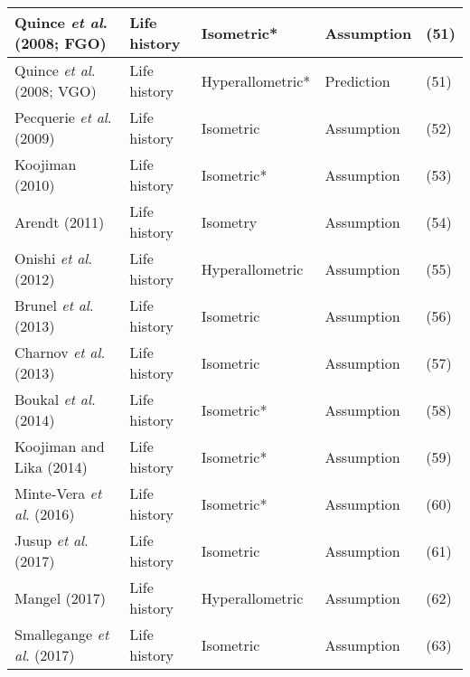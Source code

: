 \documentclass[a4paper]{article} %
\begin{document}
\begin{table}[]
\begin{tabular}{|l|l|l|l|l|}
        Quince \textit{et al}. (2008; FGO)      & Life history        & Isometric*       & Assumption                        & (51)          \\ \hline
        Quince \textit{et al}. (2008; VGO)      & Life history        & Hyperallometric* & Prediction                        & (51)          \\ \hline
        Pecquerie \textit{et al}. (2009)        & Life history        & Isometric        & Assumption                        & (52)          \\ \hline
        Koojiman (2010)                         & Life history        & Isometric*       & Assumption                        & (53)          \\ \hline
        Arendt (2011)                           & Life history        & Isometry         & Assumption                        & (54)          \\ \hline
        Onishi \textit{et al}. (2012)           & Life history        & Hyperallometric  & Assumption                        & (55)          \\ \hline
        Brunel \textit{et al}. (2013)           & Life history        & Isometric        & Assumption                        & (56)          \\ \hline
        Charnov \textit{et al}. (2013)          & Life history        & Isometric        & Assumption                        & (57)          \\ \hline
        Boukal \textit{et al}. (2014)           & Life history        & Isometric*       & Assumption                        & (58)          \\ \hline
        Koojiman and Lika (2014)                & Life history        & Isometric*       & Assumption                        & (59)          \\ \hline
        Minte-Vera \textit{et al}. (2016)       & Life history        & Isometric*       & Assumption                        & (60)          \\ \hline
        Jusup \textit{et al}. (2017)            & Life history        & Isometric        & Assumption                        & (61)          \\ \hline
        Mangel (2017)                           & Life history        & Hyperallometric  & Assumption                        & (62)          \\ \hline
        Smallegange \textit{et al}. (2017)      & Life history        & Isometric        & Assumption                        & (63)          \\ \hline

\end{tabular}
\end{table}
\end{document}

